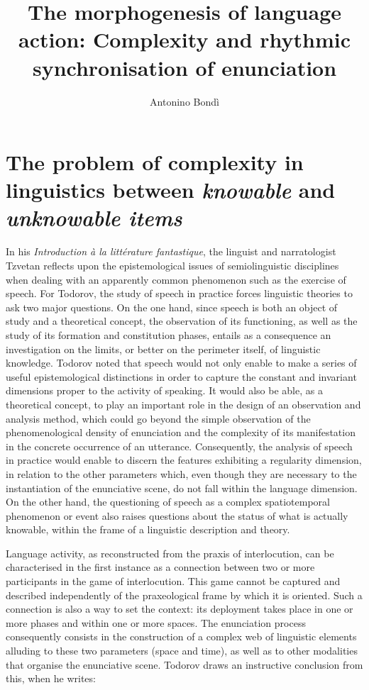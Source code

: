 \documentclass[output=paper]{langscibook}
\author{Antonino Bondì\affiliation{Università di Catania}}
\title[The morphogenesis of language action]
      {The morphogenesis of language action: Complexity and rhythmic synchronisation of enunciation}
\begin{document}
\AffiliationsWithoutIndexing{}
\maketitle 

\section{The problem of complexity in linguistics between \textit{knowable} and \textit{unknowable items}}

In his \textit{Introduction à la littérature fantastique}, the linguist and narratologist Tzvetan \citet{Todorov1970} reflects upon the epistemological issues of semiolinguistic disciplines when dealing with an apparently common phenomenon such as the exercise of speech. For Todorov, the study of speech in practice forces linguistic theories to ask two major questions. On the one hand, since speech is both an object of study and a theoretical concept, the observation of its functioning, as well as the study of its formation and constitution phases, entails as a consequence an investigation on the limits, or better on the perimeter itself, of linguistic knowledge. Todorov noted that speech would not only enable to make a series of useful epistemological distinctions in order to capture the constant and invariant dimensions proper to the activity of speaking. It would also be able, as a theoretical concept, to play an important role in the design of an observation and analysis method, which could go beyond the simple observation of the phenomenological density of enunciation and the complexity of its manifestation in the concrete occurrence of an utterance. Consequently, the analysis of speech in practice would enable to discern the features exhibiting a regularity dimension, in relation to the other parameters which, even though they are necessary to the instantiation of the enunciative scene, do not fall within the language dimension. On the other hand, the questioning of speech as a complex spatiotemporal phenomenon or event also raises questions about the status of what is actually knowable, within the frame of a linguistic description and theory. 

Language activity, as reconstructed from the praxis of interlocution, can be characterised in the first instance as a connection between two or more participants in the game of interlocution. This game cannot be captured and described independently of the praxeological frame by which it is oriented. Such a connection is also a way to set the context: its deployment takes place in one or more phases and within one or more spaces. The enunciation process consequently consists in the construction of a complex web of linguistic elements alluding to these two parameters (space and time), as well as to other modalities that organise the enunciative scene. Todorov draws an instructive conclusion from this, when he writes:
\end{document}
